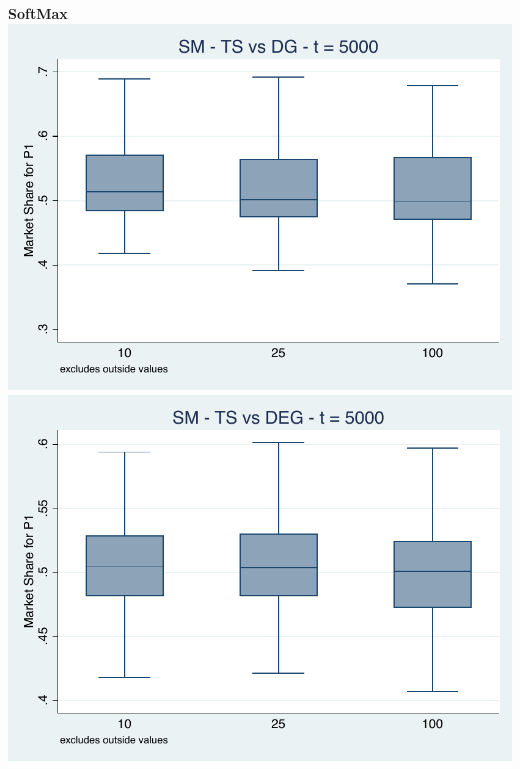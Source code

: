 \documentclass[11pt,letterpaper]{article}
\begin{document}
\pagebreak
\textbf{SoftMax} \\
\includegraphics[scale=0.9]{sm_ts_dg_memory_5000} \\ \includegraphics[scale=0.9]{sm_ts_deg_memory_5000}
\end{document}
